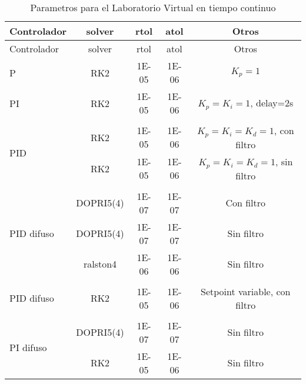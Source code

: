         {\setlength\LTleft{0pt}
        \setlength\LTright{0pt}
        \centering
        \footnotesize
        \renewcommand{\arraystretch}{0.89}
        \begin{longtable}{l @{\extracolsep{\fill}} cccc}
        \caption[Parametros para el Laboratorio Virtual en tiempo continuo]{Parametros para el Laboratorio Virtual en tiempo continuo} 
        \label{tab:parametrosLVc} \\
        \toprule
        Controlador  & solver & rtol & atol & Otros       \\ \midrule
        \endfirsthead
        \toprule
        Controlador  & solver & rtol & atol & Otros       \\ \midrule
        \endhead
        \bottomrule
        \endfoot
         P                          & RK2       & \num{1E-05} & \num{1E-06} & $K_p=1$                                   \\
         PI                         & RK2       & \num{1E-05} & \num{1E-06} & $K_p=K_i=1$, delay=2s                     \\
         &&&& \\[-3pt]
         \multirow{2}{*}{PID}       & RK2       & \num{1E-05} & \num{1E-06} & $K_p=K_i=K_d=1$, con filtro               \\
                                    & RK2       & \num{1E-05} & \num{1E-06} & $K_p=K_i=K_d=1$, sin filtro               \\
         &&&& \\[-3pt]
         \multirow{3}{*}{PID difuso}& DOPRI5(4) & \num{1E-07} & \num{1E-07} & Con filtro                                \\
                                    & DOPRI5(4) & \num{1E-07} & \num{1E-07} & Sin filtro                                \\
                                    & ralston4  & \num{1E-06} & \num{1E-06} & Sin filtro                                \\
         &&&& \\[-3pt]
         PID difuso                 & RK2       & \num{1E-05} & \num{1E-06} & Setpoint variable, con filtro             \\
         &&&& \\[-3pt]
         \multirow{2}{*}{PI difuso} & DOPRI5(4) & \num{1E-07} & \num{1E-07} & Sin filtro                                \\
                                    & RK2       & \num{1E-05} & \num{1E-06} & Sin filtro                                \\

\end{longtable}}
